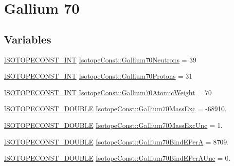 \hypertarget{group___isotope_const-_gallium-_ga70}{}\section{Gallium 70}
\label{group___isotope_const-_gallium-_ga70}
\subsection*{Variables}
\begin{DoxyCompactItemize}
\item 
\mbox{\hyperlink{group___isotope_const-_macros_ga5f18360b3e99483a35c32d789e62621c}{I\+S\+O\+T\+O\+P\+E\+C\+O\+N\+S\+T\+\_\+\+I\+NT}} \mbox{\hyperlink{group___isotope_const-_gallium-_ga70_gad91bc9a822f7b3863e5e81c292bcfd30}{Isotope\+Const\+::\+Gallium70\+Neutrons}} = 39
\item 
\mbox{\hyperlink{group___isotope_const-_macros_ga5f18360b3e99483a35c32d789e62621c}{I\+S\+O\+T\+O\+P\+E\+C\+O\+N\+S\+T\+\_\+\+I\+NT}} \mbox{\hyperlink{group___isotope_const-_gallium-_ga70_ga661afbad10f2b35be9d3124db7a0e6a0}{Isotope\+Const\+::\+Gallium70\+Protons}} = 31
\item 
\mbox{\hyperlink{group___isotope_const-_macros_ga5f18360b3e99483a35c32d789e62621c}{I\+S\+O\+T\+O\+P\+E\+C\+O\+N\+S\+T\+\_\+\+I\+NT}} \mbox{\hyperlink{group___isotope_const-_gallium-_ga70_ga61a402130aa12f63bd74d361cb2720a9}{Isotope\+Const\+::\+Gallium70\+Atomic\+Weight}} = 70
\item 
\mbox{\hyperlink{group___isotope_const-_macros_ga8f45a7272ce02c0b4c65c44636ed719a}{I\+S\+O\+T\+O\+P\+E\+C\+O\+N\+S\+T\+\_\+\+D\+O\+U\+B\+LE}} \mbox{\hyperlink{group___isotope_const-_gallium-_ga70_ga3569293b0796351171ec723776645423}{Isotope\+Const\+::\+Gallium70\+Mass\+Exc}} = -\/68910.
\item 
\mbox{\hyperlink{group___isotope_const-_macros_ga8f45a7272ce02c0b4c65c44636ed719a}{I\+S\+O\+T\+O\+P\+E\+C\+O\+N\+S\+T\+\_\+\+D\+O\+U\+B\+LE}} \mbox{\hyperlink{group___isotope_const-_gallium-_ga70_ga36ab02fb8d5dfd2e44fdacc0c4b4857b}{Isotope\+Const\+::\+Gallium70\+Mass\+Exc\+Unc}} = 1.
\item 
\mbox{\hyperlink{group___isotope_const-_macros_ga8f45a7272ce02c0b4c65c44636ed719a}{I\+S\+O\+T\+O\+P\+E\+C\+O\+N\+S\+T\+\_\+\+D\+O\+U\+B\+LE}} \mbox{\hyperlink{group___isotope_const-_gallium-_ga70_ga18b84d6f71c04ae674bbea40912c21e7}{Isotope\+Const\+::\+Gallium70\+Bind\+E\+PerA}} = 8709.
\item 
\mbox{\hyperlink{group___isotope_const-_macros_ga8f45a7272ce02c0b4c65c44636ed719a}{I\+S\+O\+T\+O\+P\+E\+C\+O\+N\+S\+T\+\_\+\+D\+O\+U\+B\+LE}} \mbox{\hyperlink{group___isotope_const-_gallium-_ga70_ga033d41c3c33a16f42b2d854359dd2c9c}{Isotope\+Const\+::\+Gallium70\+Bind\+E\+Per\+A\+Unc}} = 0.

\end{DoxyCompactItemize}
